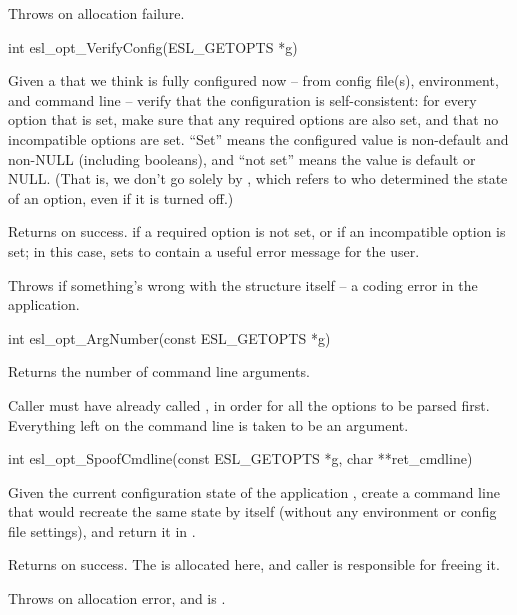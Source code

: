 \begin{sreapi}
Throws  on allocation failure.



\hypertarget{func:esl_opt_VerifyConfig()}
{\item[int esl\_opt\_VerifyConfig(ESL\_GETOPTS *g)]}

Given a  that we think is fully configured now --
from config file(s), environment, and command line --
verify that the configuration is self-consistent:
for every option that is set, make sure that any
required options are also set, and that no
incompatible options are set. ``Set'' means
the configured value is non-default and non-NULL (including booleans),
and ``not set'' means the value is default or NULL. (That is,
we don't go solely by , which refers to who
determined the state of an option, even if
it is turned off.)

Returns  on success.
 if a required option is not set, or
if an incompatible option is set; in this case, sets 
 to contain a useful error message for
the user.

Throws  if something's wrong with the 
structure itself -- a coding error in the application.           


\hypertarget{func:esl_opt_ArgNumber()}
{\item[int esl\_opt\_ArgNumber(const ESL\_GETOPTS *g)]}

Returns the number of command line arguments.

Caller must have already called
, in order for all the options
to be parsed first.  Everything left on the command line
is taken to be an argument.


\hypertarget{func:esl_opt_SpoofCmdline()}
{\item[int esl\_opt\_SpoofCmdline(const ESL\_GETOPTS *g, char **ret\_cmdline)]}

Given the current configuration state of the application
, create a command line that would recreate the same
state by itself (without any environment or config file
settings), and return it in .

Returns  on success. The  is allocated here,
and caller is responsible for freeing it.

Throws  on allocation error, and  is .




\end{sreapi}
